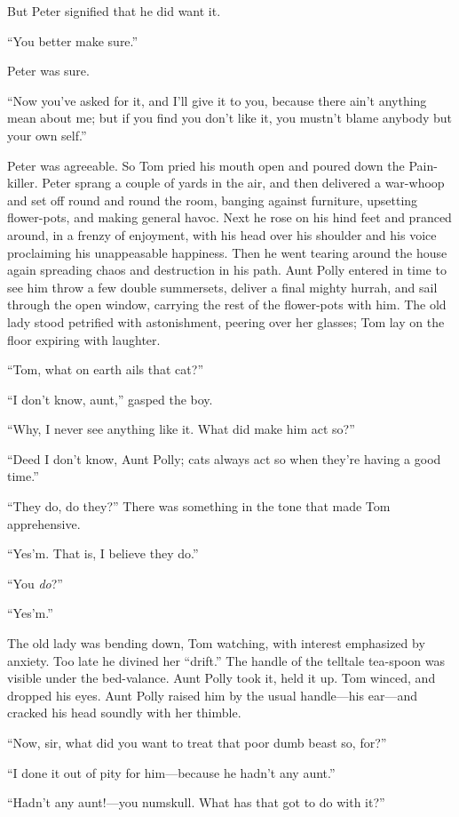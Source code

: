 \documentclass{book}
\begin{document}
But Peter signified that he did want it.

“You better make sure.”

Peter was sure.

“Now you’ve asked for it, and I’ll give it to you, because there ain’t anything mean about me; but if you find you don’t like it, you mustn’t blame anybody but your own self.”

Peter was agreeable. So Tom pried his mouth open and poured down the Pain-killer. Peter sprang a couple of yards in the air, and then delivered a war-whoop and set off round and round the room, banging against furniture, upsetting flower-pots, and making general havoc. Next he rose on his hind feet and pranced around, in a frenzy of enjoyment, with his head over his shoulder and his voice proclaiming his unappeasable happiness. Then he went tearing around the house again spreading chaos and destruction in his path. Aunt Polly entered in time to see him throw a few double summersets, deliver a final mighty hurrah, and sail through the open window, carrying the rest of the flower-pots with him. The old lady stood petrified with astonishment, peering over her glasses; Tom lay on the floor expiring with laughter.

“Tom, what on earth ails that cat?”

“I don’t know, aunt,” gasped the boy.

“Why, I never see anything like it. What did make him act so?”

“Deed I don’t know, Aunt Polly; cats always act so when they’re having a good time.”

“They do, do they?” There was something in the tone that made Tom apprehensive.

“Yes’m. That is, I believe they do.”

“You \emph{do}?”

“Yes’m.”

The old lady was bending down, Tom watching, with interest emphasized by anxiety. Too late he divined her “drift.” The handle of the telltale tea-spoon was visible under the bed-valance. Aunt Polly took it, held it up. Tom winced, and dropped his eyes. Aunt Polly raised him by the usual handle—his ear—and cracked his head soundly with her thimble.

“Now, sir, what did you want to treat that poor dumb beast so, for?”

“I done it out of pity for him—because he hadn’t any aunt.”

“Hadn’t any aunt!—you numskull. What has that got to do with it?”
\end{document}
